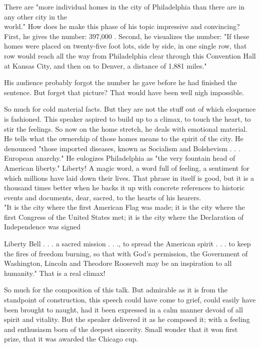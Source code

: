 \documentclass[10pt]{article}
\begin{document}
There are "more individual homes in the city of Philadelphia than there are in any other city in the\\
world." How does he make this phase of his topic impressive and convincing? First, he gives the number: 397,000 . Second, he visualizes the number: "If these homes were placed on twenty-five foot lots, side by side, in one single row, that row would reach all the way from Philadelphia clear through this Convention Hall at Kansas City, and then on to Denver, a distance of 1,881 miles."

His audience probably forgot the number he gave before he had finished the sentence. But forget that picture? That would have been well nigh impossible.

So much for cold material facts. But they are not the stuff out of which eloquence is fashioned. This speaker aspired to build up to a climax, to touch the heart, to stir the feelings. So now on the home stretch, he deals with emotional material. He tells what the ownership of those homes means to the spirit of the city. He denounced "those imported diseases, known as Socialism and Bolshevism . . . European anarchy." He eulogizes Philadelphia as "the very fountain head of American liberty." Liberty! A magic word, a word full of feeling, a sentiment for which millions have laid down their lives. That phrase in itself is good, but it is a thousand times better when he backs it up with concrete references to historic events and documents, dear, sacred, to the hearts of his hearers.\\
"It is the city where the first American Flag was made; it is the city where the first Congress of the United States met; it is the city where the Declaration of Independence was signed

Liberty Bell . . . a sacred mission . . ., to spread the American spirit . . . to keep the fires of freedom burning, so that with God's permission, the Government of Washington, Lincoln and Theodore Roosevelt may be an inspiration to all humanity." That is a real climax!

So much for the composition of this talk. But admirable as it is from the standpoint of construction, this speech could have come to grief, could easily have been brought to naught, had it been expressed in a calm manner devoid of all spirit and vitality. But the speaker delivered it as he composed it; with a feeling and enthusiasm born of the deepest sincerity. Small wonder that it won first prize, that it was awarded the Chicago cup.
\end{document}
